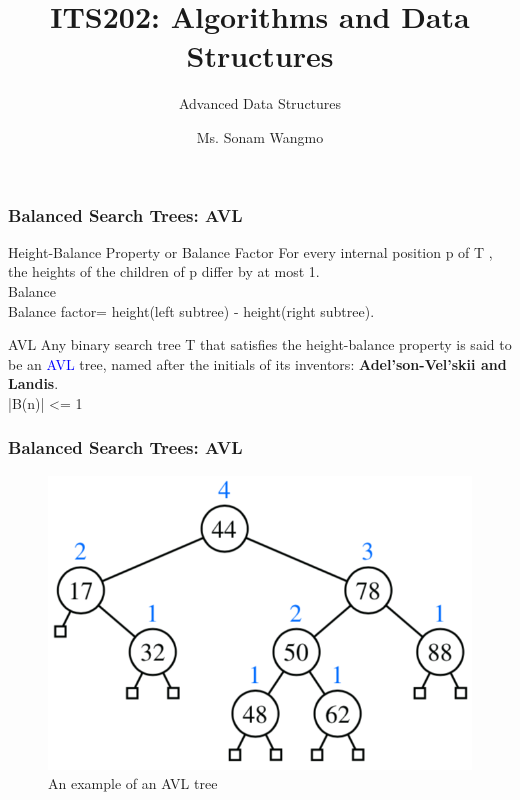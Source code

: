 \documentclass[11pt]{beamer}
\begin{document}
	\author{Ms. Sonam Wangmo}
	\title{ITS202: Algorithms and Data Structures}
	\subtitle{Advanced Data Structures}
	\institute{
		\textcolor{blue}{Gyalpozhing College of Information Technology \\ Royal University of Bhutan} \\
		\vspace{0.5cm}
	}
	\begin{frame}[plain]
		\maketitle 
	\end{frame}

	\begin{frame}
		\frametitle{Balanced Search Trees: AVL}
	    \begin{block}{Height-Balance Property or Balance Factor}
	    	For every internal position p of T , the heights of the children of p differ by at most 1.\\
	    	\alert{Balance}\\
	    	Balance factor= height(left subtree) - height(right subtree).
	    \end{block}
      \begin{block}{AVL}
      	Any binary search tree T that satisfies the height-balance property is said to be an \textcolor{blue}{AVL} tree, named after the initials of its inventors: \textbf{Adel’son-Vel’skii and Landis}.\\
      	\alert{|B(n)| <= 1}
      \end{block}
	\end{frame}	

    \begin{frame}
    	\frametitle{Balanced Search Trees: AVL}
        \begin{figure}
        	\centering
        	\includegraphics[width=0.8\linewidth]{"Screenshot 2020-11-19 at 3.10.01 PM"}
        	\caption{An example of an AVL tree}
        	\label{fig:screenshot-2020-11-19-at-3}
        \end{figure}
    \end{frame}	
 
\end{document}
